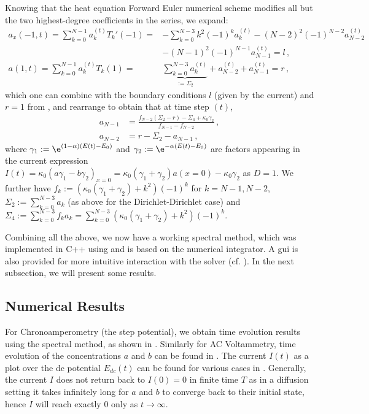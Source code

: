 \documentclass{prettytex/ox/mmsc-special-topic}
\begin{document}
  Knowing that the heat equation Forward Euler numerical scheme modifies all but the two highest-degree coefficients in the series, we expand:
  \begin{align*}
    a_x(-1, t) = \sum_{k=0}^{N-1} a_k^{(t)} T_k'(-1) =   & -\sum_{k=0}^{N-3} k^2 (-1)^{k} a_k^{(t)} - (N-2)^2 (-1)^{N-2} a_{N-2}^{(t)}                                                  \\
                                                         & -(N-1)^2 (-1)^{N-1} a_{N-1}^{(t)} = l\,,                                                                                     \\
    a(1, t)    = \sum_{k=0}^{N-1} a_k^{(t)} T_k(1)     = & \underbrace{\sum_{k=0}^{N-3} a_k^{(t)}}_{:= \Sigma_2}              + a_{N-2}^{(t)}                    + a_{N-1}^{(t)} = r\,,
  \end{align*}
  which one can combine with the boundary conditions $l$ (given by the current) and $r = 1$ from , and rearrange to obtain that at time step ${(t)}$,
  \begin{align}
    a_{N-1} & = \frac{f_{N-2}(\Sigma_2 - r) - \Sigma_4 + \kappa_0 \gamma_2}{f_{N-1} - f_{N-2}}\,, \\
    a_{N-2} & = r - \Sigma_2 - a_{N-1}\,,
  \end{align}
  where $\gamma_1 := \e^{(1-\alpha)(E(t) - E_0)}$ and $\gamma_2 := \e^{-\alpha(E(t) - E_0)}$ are factors appearing in the current expression $I(t) = \kappa_0 \left(a \gamma_1 - b \gamma_2\right)_{x=0} = \kappa_0 (\gamma_1 + \gamma_2) a(x=0) - \kappa_0 \gamma_2$ as $D=1$.
  We further have $f_k := \left(\kappa_0 (\gamma_1 + \gamma_2) + k^2\right)(-1)^k$ for $k = N-1, N-2$, $\Sigma_2 := \sum_{k=0}^{N-3} a_k$ (as above for the Dirichlet-Dirichlet case) and $\Sigma_4 := \sum_{k=0}^{N-3} f_k a_k = \sum_{k=0}^{N-3} \left(\kappa_0 (\gamma_1 + \gamma_2) + k^2\right)(-1)^k$.

  Combining all the above, we now have a working spectral method, which was implemented in C++ using \tschebfun and is based on the \heatfun numerical integrator.
  A \gls{gui} is also provided for more intuitive interaction with the solver (cf. ).
  In the next subsection, we will present some results.

  \subsection{Numerical Results}
  For Chronoamperometry (the step potential), we obtain time evolution results using the spectral method, as shown in .
  Similarly for AC Voltammetry, time evolution of the concentrations $a$ and $b$ can be found in .
  The current $I(t)$ as a plot over the \gls{dc} potential $E_{dc}(t)$ can be found for various cases in .
  Generally, the current $I$ does not return back to $I(0) = 0$ in finite time $T$ as in a diffusion setting it takes infinitely long for $a$ and $b$ to converge back to their initial state, hence $I$ will reach exactly $0$ only as $t \rightarrow \infty$.
\end{document}

